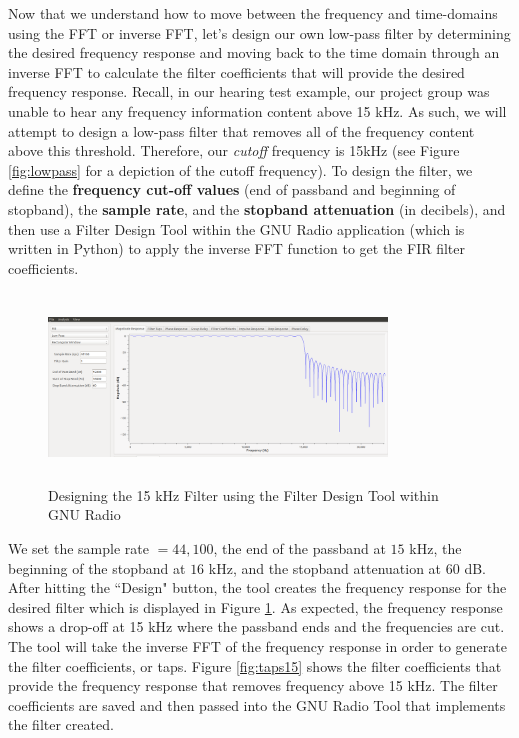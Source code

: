 Now that we understand how to move between the frequency and
time-domains using the FFT or inverse FFT, let's design our own
low-pass filter by determining the desired frequency response and
moving back to the time domain through an inverse FFT to
calculate the filter coefficients that will provide the desired
frequency response. Recall, in our hearing test example, our
project group was unable to hear any frequency information
content above 15 kHz. As such, we will attempt to design a
low-pass filter that removes all of the frequency content above
this threshold. Therefore, our \textit{cutoff} frequency is 15kHz
(see Figure \ref{fig:lowpass} for a depiction of the cutoff
frequency). To design the filter, we define the \textbf{frequency
cut-off values} (end of passband and beginning of stopband), the
\textbf{sample rate}, and the \textbf{stopband attenuation} (in
decibels), and then use a Filter Design Tool within the GNU Radio
application (which is written in Python) to apply the inverse FFT
function to get the FIR filter coefficients.  

\begin{figure}[h!]
	\centering
	\includegraphics[height = 5cm, width =9cm]{images/filter_tool_15kHz.png} %
	\caption{Designing the 15 kHz Filter using the Filter Design Tool within GNU Radio}
	\label{fig:mainfilt}
\end{figure}  

We set the sample rate $= 44,100$, the end of the passband at
$15$ kHz, the beginning of the stopband at $16$ kHz, and the
stopband attenuation at $60$ dB. After hitting the ``Design"
button, the tool creates the frequency response for the desired
filter which is displayed in Figure \ref{fig:mainfilt}. As
expected, the frequency response shows a drop-off at 15 kHz where
the passband ends and the frequencies are cut. The tool will take
the inverse FFT of the frequency response in order to generate
the filter coefficients, or taps. Figure \ref{fig:taps15} shows
the filter coefficients that provide the frequency response that
removes frequency above 15 kHz. The filter coefficients are saved
and then passed into the GNU Radio Tool that implements the
filter created.  

